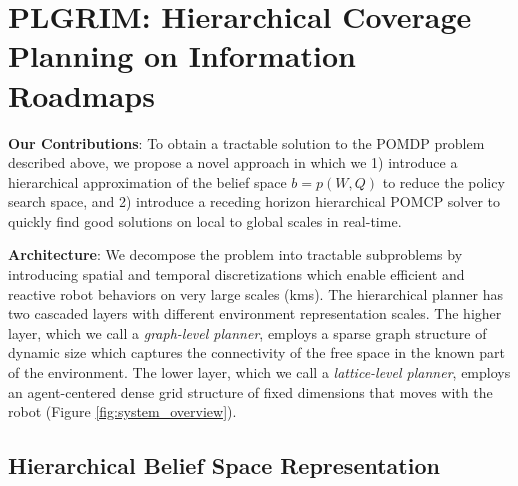 \documentclass{article}
\newcommand{\ph}[1]{{\textbf{#1}:}} %
\begin{document}
\section{PLGRIM: Hierarchical Coverage Planning on Information Roadmaps}
\label{sec:plgrim}

\ph{Our Contributions} 
To obtain a tractable solution to the POMDP problem described above, we propose a novel approach in which we 1) introduce a hierarchical approximation of the belief space $b=p(W,Q)$ to reduce the policy search space, and 2) introduce a receding horizon hierarchical POMCP solver to quickly find good solutions on local to global scales in real-time.

\ph{Architecture}  We decompose the problem into tractable subproblems by introducing spatial and temporal discretizations which enable efficient and reactive robot behaviors on very large scales (kms).  The hierarchical planner has two cascaded layers with different environment representation scales. The higher layer, which we call a \emph{graph-level planner}, employs a sparse graph structure of dynamic size which captures the connectivity of the free space in the known part of the environment. The lower layer, which we call a \emph{lattice-level planner}, employs an agent-centered dense grid structure of fixed dimensions that moves with the robot (Figure \ref{fig:system_overview}). %

\subsection{Hierarchical Belief Space Representation} 
\end{document}
